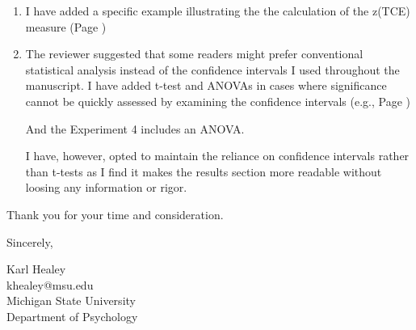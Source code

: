 \documentclass[12pt]{article}
\begin{document}
\begin{enumerate}
	\item
	I have added a specific example illustrating the the calculation of the z(TCE) measure  (Page \pageref{TODO-15})

	\item
	The reviewer suggested that some readers might prefer conventional statistical analysis instead of the confidence intervals I used throughout the manuscript. I have added t-test and ANOVAs in cases where significance cannot be quickly assessed by examining the confidence intervals (e.g., Page \pageref{t1})

	And the Experiment 4 includes an ANOVA.

	I have, however, opted to maintain the reliance on confidence intervals rather than t-tests as I find it makes the results section more readable without loosing any information or rigor. 



	

\end{enumerate}





\vspace{20pt}

Thank you for your time and consideration.

\vspace{10pt}

Sincerely,

\vspace{10pt}

Karl Healey\\
khealey@msu.edu\\
Michigan State University\\
Department of Psychology

%
\end{document}
